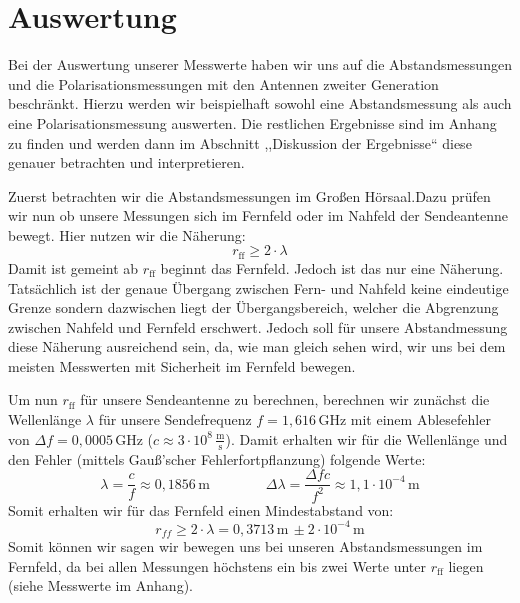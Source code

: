 \documentclass[titlepage,11pt,a4paper,ngerman]{article}
\newcommand{\tx}[1]{\textrm{#1}}
\begin{document}
\section{Auswertung}
Bei der Auswertung unserer Messwerte haben wir uns auf die Abstandsmessungen und die Polarisationsmessungen mit den Antennen zweiter Generation beschränkt. Hierzu werden wir beispielhaft sowohl eine Abstandsmessung als auch eine Polarisationsmessung auswerten. Die restlichen Ergebnisse sind im Anhang zu finden und werden dann im Abschnitt  ,,Diskussion der Ergebnisse`` diese genauer betrachten und interpretieren. \par 
Zuerst betrachten wir die Abstandsmessungen im Großen Hörsaal.Dazu prüfen wir nun ob unsere Messungen sich im Fernfeld oder im Nahfeld der Sendeantenne bewegt. Hier nutzen wir die Näherung:
\begin{equation}
r_{\tx{ff}} \geqslant 2\cdot\lambda
\label{rff}
\end{equation}
Damit ist gemeint ab $r_{\tx{ff}}$ beginnt das Fernfeld. Jedoch ist das nur eine Näherung. Tatsächlich ist der genaue Übergang zwischen Fern- und Nahfeld keine eindeutige Grenze sondern dazwischen liegt der Übergangsbereich, welcher die Abgrenzung zwischen Nahfeld und Fernfeld erschwert. Jedoch soll für unsere Abstandmessung diese Näherung ausreichend sein, da, wie man gleich sehen wird, wir uns bei dem meisten Messwerten mit Sicherheit im Fernfeld bewegen. \par 
Um nun $r_{\tx{ff}}$ für unsere Sendeantenne zu berechnen, berechnen wir zunächst die Wellenlänge $\lambda$ für unsere Sendefrequenz $f=1{,}616\,$GHz mit einem Ablesefehler von $\Delta f=0{,}0005\,$GHz ($c\approx 3\cdot10^{8}\,\frac{\tx{m}}{\tx{s}}$). Damit erhalten wir für die Wellenlänge und den Fehler (mittels Gauß'scher Fehlerfortpflanzung) folgende Werte:
\begin{equation*}
\lambda = \frac{c}{f} \approx 0{,}1856\,\tx{m} \qquad \qquad
\Delta \lambda = \frac{\Delta f c}{f^{2}} \approx 1{,}1 \cdot 10^{-4}\,\tx{m}
\end{equation*}
Somit erhalten wir für das Fernfeld einen Mindestabstand von: 
\begin{equation*}
r_{ff} \geqslant 2\cdot\lambda = 0{,}3713\,\tx{m}\, \pm 2\cdot10^{-4}\,\tx{m}
\end{equation*}
Somit können wir sagen wir bewegen uns bei unseren Abstandsmessungen im Fernfeld, da bei allen Messungen höchstens ein bis zwei Werte unter $r_{\tx{ff}}$ liegen (siehe Messwerte im Anhang). \par 
\end{document}
